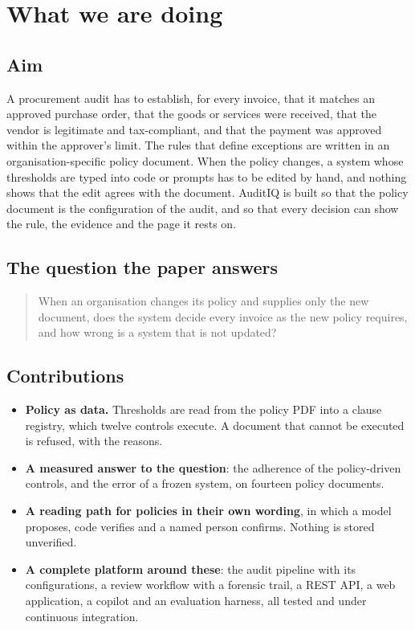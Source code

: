 \documentclass[11pt,a4paper]{article}
\begin{document}
\section{What we are doing}
\subsection{Aim}
A procurement audit has to establish, for every invoice, that it matches an approved purchase order, that the goods or services were received, that the vendor is legitimate and tax-compliant, and that the payment was approved within the approver's limit. The rules that define exceptions are written in an organisation-specific policy document. When the policy changes, a system whose thresholds are typed into code or prompts has to be edited by hand, and nothing shows that the edit agrees with the document. AuditIQ is built so that the policy document is the configuration of the audit, and so that every decision can show the rule, the evidence and the page it rests on.

\subsection{The question the paper answers}
\begin{quote}
When an organisation changes its policy and supplies only the new document, does the system decide every invoice as the new policy requires, and how wrong is a system that is not updated?
\end{quote}

\subsection{Contributions}
\begin{itemize}
\item \textbf{Policy as data.} Thresholds are read from the policy PDF into a clause registry, which twelve controls execute. A document that cannot be executed is refused, with the reasons.
\item \textbf{A measured answer to the question}: the adherence of the policy-driven controls, and the error of a frozen system, on fourteen policy documents.
\item \textbf{A reading path for policies in their own wording}, in which a model proposes, code verifies and a named person confirms. Nothing is stored unverified.
\item \textbf{A complete platform around these}: the audit pipeline with its configurations, a review workflow with a forensic trail, a REST API, a web application, a copilot and an evaluation harness, all tested and under continuous integration.
\end{itemize}
\end{document}
